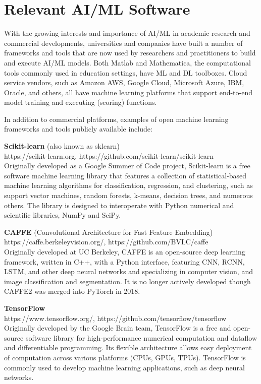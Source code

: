 \section{Relevant AI/ML Software}
\label{sec:ai_tools}

With the growing interests and importance of AI/ML in academic research and commercial developments, universities and companies have built a number of frameworks and tools that are now used by researchers and practitioners to build and execute AI/ML models. Both Matlab and Mathematica, the computational tools commonly used in education settings, have ML and DL toolboxes. Cloud service vendors, such as Amazon AWS, Google Cloud, Microsoft Azure, IBM, Oracle, and others, all have machine learning platforms that support end-to-end model training and executing (scoring) functions. 

In addition to commercial platforms, examples of open machine learning frameworks and tools publicly available include:
\newline

\noindent\textbf{Scikit-learn} (also known as sklearn) \\https://scikit-learn.org, https://github.com/scikit-learn/scikit-learn\\Originally developed as a Google Summer of Code project, Scikit-learn is a free software machine learning library that features a collection of statistical-based machine learning algorithms for classification, regression, and clustering, such as support vector machines, random forests, k-means, decision trees, and numerous others. The library is designed to interoperate with Python numerical and scientific libraries, NumPy and SciPy. 
\newline

\noindent\textbf{CAFFE} (Convolutional Architecture for Fast Feature Embedding) \\https://caffe.berkeleyvision.org/, https://github.com/BVLC/caffe \\Originally developed at UC Berkeley, CAFFE is an open-source deep learning framework, written in C++, with a Python interface, featuring CNN, RCNN, LSTM, and other deep neural networks and specializing in computer vision, and image classification and segmentation. It is no longer actively developed though CAFFE2 was merged into PyTorch in 2018.
\newline

\noindent\textbf{TensorFlow} \\https://www.tensorflow.org/, https://github.com/tensorflow/tensorflow \\Originally developed by the Google Brain team, TensorFlow is a free and open-source software library for high-performance numerical computation and dataflow and differentiable programming. Its flexible architecture allows easy deployment of computation across various platforms (CPUs, GPUs, TPUs). TensorFlow is commonly used to develop machine learning applications, such as deep neural networks.
\newline

